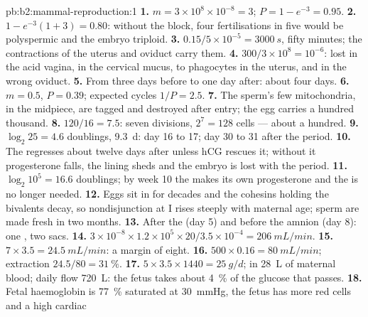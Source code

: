 \begin{solution}{pb:b2:mammal-reproduction:1}
\textbf{1.} $m = 3\times 10^{8}\times 10^{-8} = 3$; $P = 1 - e^{-3} =
0.95$.
\textbf{2.} $1 - e^{-3}(1 + 3) = 0.80$: without the block, four
fertilisations in five would be polyspermic and the embryo triploid.
\textbf{3.} $0.15/5\times 10^{-5} = \qty{3000}{s}$, fifty minutes;
the contractions of the uterus and oviduct carry them.
\textbf{4.} $300/3\times 10^{8} = 10^{-6}$: lost in the acid vagina,
in the cervical mucus, to phagocytes in the uterus, and in the wrong
oviduct.
\textbf{5.} From three days before  to one day after: about
four days.
\textbf{6.} $m = 0.5$, $P = 0.39$; expected cycles $1/P = 2.5$.
\textbf{7.} The sperm's few mitochondria, in the midpiece, are tagged
and destroyed after entry; the egg carries a hundred thousand.
\textbf{8.} $120/16 = 7.5$: seven divisions, $2^{7} = 128$ cells ---
about a hundred.
\textbf{9.} $\log_2 25 = 4.6$ doublings, \qty{9.3}{d}: day 16 to 17;
day 30 to 31 after the period.
\textbf{10.} The  regresses about twelve days after
 unless hCG rescues it; without it progesterone falls, the
lining sheds and the embryo is lost with the period.
\textbf{11.} $\log_2 10^{5} = 16.6$ doublings; by week 10 the
 makes its own progesterone and the  is no
longer needed.
\textbf{12.} Eggs sit in  for decades and the cohesins
holding the bivalents decay, so nondisjunction at  I rises
steeply with maternal age; sperm are made fresh in two months.
\textbf{13.} After the  (day 5) and before the amnion (day
8): one , two sacs.
\textbf{14.} $3\times 10^{-8}\times 1.2\times 10^{5}\times 20/3.5\times
10^{-4} = \qty{206}{mL/min}$.
\textbf{15.} $7\times 3.5 = \qty{24.5}{mL/min}$: a margin of eight.
\textbf{16.} $500\times 0.16 = \qty{80}{mL/min}$; extraction
$24.5/80 = \qty{31}{\%}$.
\textbf{17.} $5\times 3.5\times 1440 = \qty{25}{g/d}$; in \qty{28}{L}
of maternal blood; daily flow \qty{720}{L}: the fetus takes about
\qty{4}{\%} of the glucose that passes.
\textbf{18.} Fetal haemoglobin is \qty{77}{\%} saturated at
\qty{30}{mmHg}, the fetus has more red cells and a high cardiac

\end{solution}
